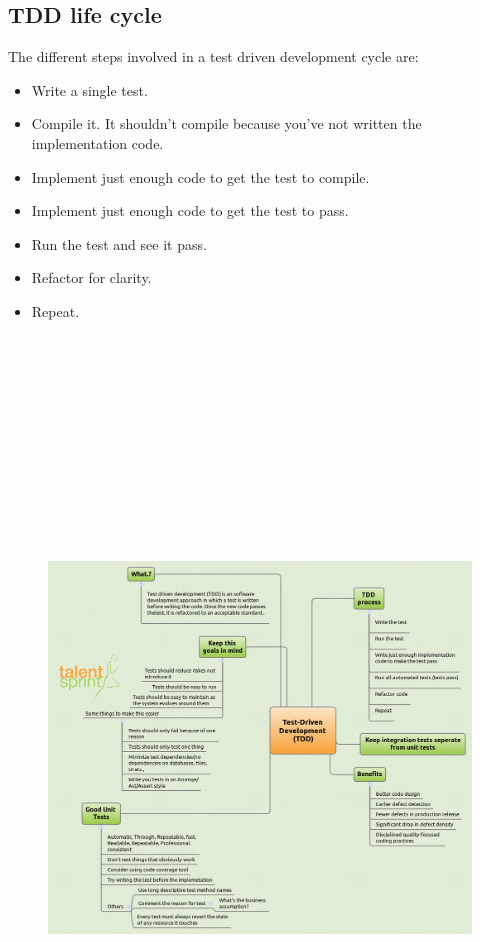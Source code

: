 \documentclass[11pt,a4paper]{article}
\begin{document}
\subsection*{TDD life cycle}
The different steps involved in a test driven development cycle are:
\begin{itemize}
\item Write a single test.
\item Compile it. It shouldn't compile because you've not written the implementation code.
\item Implement just enough code to get the test to compile.
\item Implement just enough code to get the test to pass.
\item Run the test and see it pass.
\item Refactor for clarity.
\item Repeat.
\end{itemize}
\vfill{\ }
\begin{figure}[H]
 \begin{center}
   \includegraphics[angle=90,height=20cm, width=13cm]{TDD-MM.png}
 \end{center}
 \end{figure}
\end{document}
